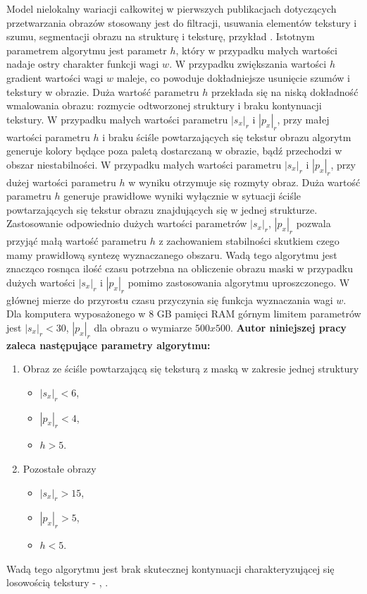 \documentclass[12pt, twoside, openany]{report}
\theoremstyle{definition}
\begin{document}
Model nielokalny wariacji całkowitej w pierwszych publikacjach dotyczących przetwarzania obrazów stosowany jest do filtracji, usuwania elementów tekstury i szumu, segmentacji obrazu na strukturę i teksturę, przykład \cite{buades2005non}. Istotnym parametrem algorytmu jest parametr $h$, który w przypadku małych wartości nadaje ostry charakter funkcji wagi $w$. W przypadku zwiększania wartości $h$ gradient wartości wagi $w$ maleje, co powoduje dokładniejsze usunięcie szumów i tekstury w obrazie. Duża wartość parametru $h$ przekłada się na niską dokładność wmalowania obrazu: rozmycie odtworzonej struktury i braku kontynuacji tekstury. W przypadku małych wartości parametru $|s_x|_r$ i $|p_x|_r$, przy małej wartości parametru $h$ i braku ściśle powtarzających się tekstur obrazu algorytm generuje kolory będące poza paletą dostarczaną w obrazie, bądź przechodzi w obszar niestabilności. W przypadku małych wartości parametru  $|s_x|_r$ i $|p_x|_r$, przy dużej wartości parametru $h$ w wyniku otrzymuje się rozmyty obraz. Duża wartość parametru $h$ generuje prawidłowe wyniki wyłącznie w sytuacji ściśle powtarzających się tekstur obrazu znajdujących się w jednej strukturze. Zastosowanie odpowiednio dużych wartości parametrów $|s_x|_r$, $|p_x|_r$ pozwala przyjąć małą wartość parametru $h$ z zachowaniem stabilności skutkiem czego mamy prawidłową syntezę wyznaczanego obszaru. Wadą tego algorytmu jest znacząco rosnąca ilość czasu potrzebna na obliczenie obrazu maski w przypadku dużych wartości $|s_x|_r$ i $|p_x|_r$ pomimo zastosowania algorytmu uproszczonego. W głównej mierze do przyrostu czasu przyczynia się funkcja wyznaczania wagi $w$. Dla komputera wyposażonego w 8 GB pamięci RAM górnym limitem parametrów jest $|s_x|_r <30$, $|p_x|_r$ dla obrazu o wymiarze $500x500$. \textbf{Autor niniejszej pracy zaleca następujące parametry algorytmu:}
\begin{enumerate}
\item Obraz ze ściśle powtarzającą się teksturą z maską w zakresie jednej struktury
\begin{itemize}
\item $|s_x|_r < 6$,
\item $|p_x|_r < 4$,
\item $h > 5$.
\end{itemize}
\item Pozostałe obrazy
\begin{itemize}
\item $|s_x|_r > 15$,
\item $|p_x|_r > 5$,
\item $h < 5$.
\end{itemize}
\end{enumerate}
Wadą tego algorytmu jest brak skutecznej kontynuacji charakteryzującej się losowością tekstury - \kotmyszm, \ObrIm .
\end{document}
